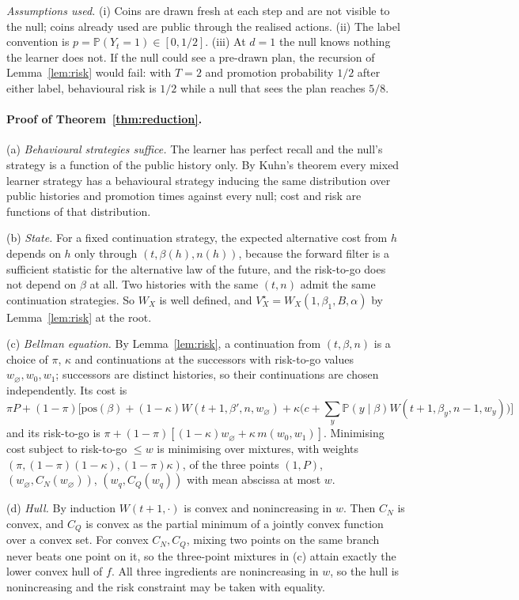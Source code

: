 \documentclass{article}
\theoremstyle{plain}
\theoremstyle{definition}
\theoremstyle{remark}
\newcommand{\PP}{\mathbb{P}}
\newcommand{\pos}{\mathrm{pos}}
\begin{document}
\emph{Assumptions used.} (i) Coins are drawn fresh at each step and are not visible to the null; coins already used are public through the realised actions. (ii) The label convention is $p=\PP(Y_t=1)\in[0,1/2]$. (iii) At $d=1$ the null knows nothing the learner does not. If the null could see a pre-drawn plan, the recursion of Lemma~\ref{lem:risk} would fail: with $T=2$ and promotion probability $1/2$ after either label, behavioural risk is $1/2$ while a null that sees the plan reaches $5/8$.

\paragraph{Proof of Theorem~\ref{thm:reduction}.}
(a) \emph{Behavioural strategies suffice.} The learner has perfect recall and the null's strategy is a function of the public history only. By Kuhn's theorem \citep{kuhn1953extensive} every mixed learner strategy has a behavioural strategy inducing the same distribution over public histories and promotion times against every null; cost and risk are functions of that distribution.

(b) \emph{State.} For a fixed continuation strategy, the expected alternative cost from $h$ depends on $h$ only through $(t,\beta(h),n(h))$, because the forward filter is a sufficient statistic for the alternative law of the future, and the risk-to-go does not depend on $\beta$ at all. Two histories with the same $(t,n)$ admit the same continuation strategies. So $W_X$ is well defined, and $V^\star_X=W_X(1,\beta_1,B,\alpha)$ by Lemma~\ref{lem:risk} at the root.

(c) \emph{Bellman equation.} By Lemma~\ref{lem:risk}, a continuation from $(t,\beta,n)$ is a choice of $\pi$, $\kappa$ and continuations at the successors with risk-to-go values $w_\varnothing,w_0,w_1$; successors are distinct histories, so their continuations are chosen independently. Its cost is
\[
\pi P+(1-\pi)\Big[\pos(\beta)+(1-\kappa)W(t+1,\beta',n,w_\varnothing)+\kappa\big(c+\textstyle\sum_y\PP(y\mid\beta)W(t+1,\beta_y,n-1,w_y)\big)\Big]
\]
and its risk-to-go is $\pi+(1-\pi)[(1-\kappa)w_\varnothing+\kappa\,m(w_0,w_1)]$. Minimising cost subject to risk-to-go $\le w$ is minimising over mixtures, with weights $(\pi,(1-\pi)(1-\kappa),(1-\pi)\kappa)$, of the three points $(1,P)$, $(w_\varnothing,C_N(w_\varnothing))$, $(w_q,C_Q(w_q))$ with mean abscissa at most $w$.

(d) \emph{Hull.} By induction $W(t+1,\cdot)$ is convex and nonincreasing in $w$. Then $C_N$ is convex, and $C_Q$ is convex as the partial minimum of a jointly convex function over a convex set. For convex $C_N,C_Q$, mixing two points on the same branch never beats one point on it, so the three-point mixtures in (c) attain exactly the lower convex hull of $f$. All three ingredients are nonincreasing in $w$, so the hull is nonincreasing and the risk constraint may be taken with equality.
\end{document}
